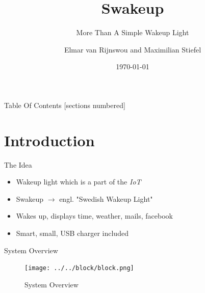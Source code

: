 \documentclass[apectratio=169]{beamer}
\title{Swakeup}
\subtitle{More Than A Simple Wakeup Light}
\date{\today}
\author{Elmar van Rijnswou and Maximilian Stiefel}
\institute{Uppsala University}
\begin{document}
  \maketitle

\begin{frame}{Table Of Contents}
  [sections numbered]
  \tableofcontents[hideallsubsections]
\end{frame}

  \section{Introduction}
  	\begin{frame}{The Idea}
		\begin{itemize}
			\item<1-> Wakeup light which is a part of the \textit{IoT}
			\item<2-> Swakeup \ensuremath{\rightarrow} engl. "Swedish Wakeup Light"
			\item<3-> Wakes up, displays time, weather, mails, facebook
			\item<4-> Smart, small, USB charger included
		\end{itemize}
  	\end{frame}
  	\begin{frame}{System Overview}	
		\begin{figure}
			\centering
			\texttt{[image: ../../block/block.png]}
			\caption{System Overview}
		\end{figure}
	\end{frame}
  
\end{document}

